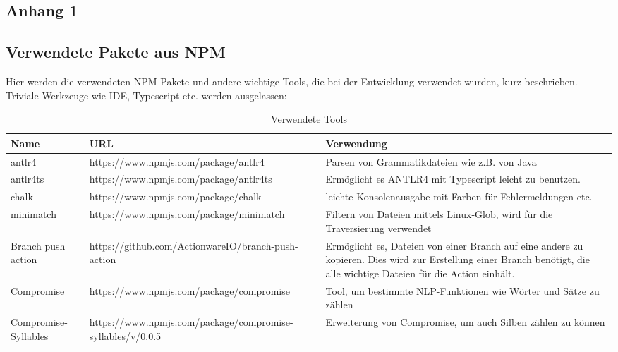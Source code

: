 
\begin{appendices}


\chapter{Anhang 1}
\section{Verwendete Pakete aus NPM}
Hier werden die verwendeten NPM-Pakete und andere wichtige Tools, die bei der Entwicklung verwendet wurden, kurz beschrieben. Triviale Werkzeuge wie IDE, Typescript etc. werden ausgelassen:
\begin{table}[h]
    \begin{tabular}{m{2.3cm}|m{8.5cm}|m{6.0cm}}
       Name  & URL & Verwendung  \\
       \hline
        antlr4 & https://www.npmjs.com/package/antlr4 & Parsen von Grammatikdateien wie z.B. von Java\\
        \hline
        antlr4ts & https://www.npmjs.com/package/antlr4ts & Ermöglicht es ANTLR4 mit Typescript leicht zu benutzen. \\\hline
        chalk & https://www.npmjs.com/package/chalk & leichte Konsolenausgabe mit Farben für Fehlermeldungen etc. \\\hline
        minimatch & https://www.npmjs.com/package/minimatch & Filtern von Dateien mittels  Linux-Glob, wird für die Traversierung verwendet\\\hline
        Branch push action & https://github.com/ActionwareIO/branch-push-action & Ermöglicht es, Dateien von einer Branch auf eine andere zu kopieren. Dies wird zur Erstellung einer Branch benötigt, die alle wichtige Dateien für die Action einhält.\\\hline
        Compromise & https://www.npmjs.com/package/compromise & Tool, um bestimmte NLP-Funktionen wie Wörter und Sätze zu zählen\\\hline
        Compromise-Syllables & https://www.npmjs.com/package/compromise-syllables/v/0.0.5 & Erweiterung von Compromise, um auch Silben zählen zu können
    \end{tabular}
    \caption{Verwendete Tools}
    \label{tab:used_tools}
\end{table}

\end{appendices}
	
